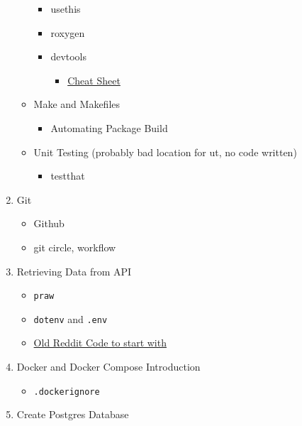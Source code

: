 \documentclass[
]{book}
\providecommand{\tightlist}{%
  \setlength{\itemsep}{0pt}\setlength{\parskip}{0pt}}
\begin{document}
\begin{enumerate}
\begin{itemize}
    \begin{itemize}
    \tightlist
    \item
      usethis
    \item
      roxygen
    \item
      devtools

      \begin{itemize}
      \tightlist
      \item
        \href{https://raw.githubusercontent.com/rstudio/cheatsheets/main/package-development.pdf}{Cheat Sheet}
      \end{itemize}
    \end{itemize}
  \item
    Make and Makefiles

    \begin{itemize}
    \tightlist
    \item
      Automating Package Build
    \end{itemize}
  \item
    Unit Testing (probably bad location for ut, no code written)

    \begin{itemize}
    \tightlist
    \item
      testthat
    \end{itemize}
  \end{itemize}
\item
  Git

  \begin{itemize}
  \tightlist
  \item
    Github
  \item
    git circle, workflow
  \end{itemize}
\item
  Retrieving Data from API

  \begin{itemize}
  \tightlist
  \item
    \texttt{praw}
  \item
    \texttt{dotenv} and \texttt{.env}
  \item
    \href{https://github.com/fdrennan/ndexr-platform/blob/master/redditor-api/R/reddit.R}{Old Reddit Code to start with}
  \end{itemize}
\item
  Docker and Docker Compose Introduction

  \begin{itemize}
  \tightlist
  \item
    \texttt{.dockerignore}
  \end{itemize}
\item
  Create Postgres Database


\end{enumerate}
\end{document}
